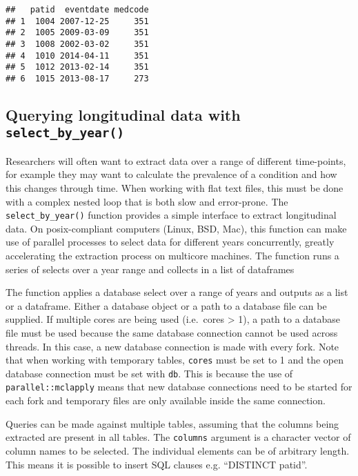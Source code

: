 \documentclass[]{article}
\begin{document}
\begin{verbatim}
##   patid  eventdate medcode
## 1  1004 2007-12-25     351
## 2  1005 2009-03-09     351
## 3  1008 2002-03-02     351
## 4  1010 2014-04-11     351
## 5  1012 2013-02-14     351
## 6  1015 2013-08-17     273
\end{verbatim}

\subsection{Querying longitudinal data with
\texttt{select\_by\_year()}}\label{querying-longitudinal-data-with-selectux5fbyux5fyear}

Researchers will often want to extract data over a range of different
time-points, for example they may want to calculate the prevalence of a
condition and how this changes through time. When working with flat text
files, this must be done with a complex nested loop that is both slow
and error-prone. The \texttt{select\_by\_year()} function provides a
simple interface to extract longitudinal data. On posix-compliant
computers (Linux, BSD, Mac), this function can make use of parallel
processes to select data for different years concurrently, greatly
accelerating the extraction process on multicore machines. The function
runs a series of selects over a year range and collects in a list of
dataframes

The function applies a database select over a range of years and outputs
as a list or a dataframe. Either a database object or a path to a
database file can be supplied. If multiple cores are being used
(i.e.~cores \textgreater{} 1), a path to a database file must be used
because the same database connection cannot be used across threads. In
this case, a new database connection is made with every fork. Note that
when working with temporary tables, \texttt{cores} must be set to 1 and
the open database connection must be set with \texttt{db}. This is
because the use of \texttt{parallel::mclapply} means that new database
connections need to be started for each fork and temporary files are
only available inside the same connection.

Queries can be made against multiple tables, assuming that the columns
being extracted are present in all tables. The \texttt{columns} argument
is a character vector of column names to be selected. The individual
elements can be of arbitrary length. This means it is possible to insert
SQL clauses e.g. ``DISTINCT patid''.
\end{document}
